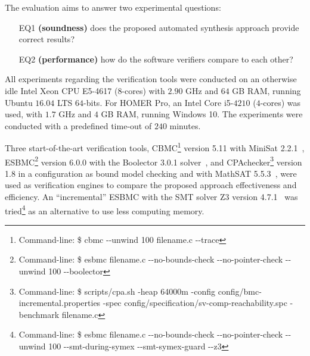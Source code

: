 The evaluation aims to answer two experimental questions: 

\begin{enumerate}

\item[EQ1] \textbf{(soundness)} does the proposed automated synthesis approach provide correct results?

\item[EQ2] \textbf{(performance)} how do the software verifiers compare to each other?

\end{enumerate}

All experiments regarding the verification tools were conducted 
on an otherwise idle Intel Xeon CPU E5-4617 ($8$-cores) with 
$2.90$ GHz and $64$ GB RAM, running Ubuntu $16.04$ LTS $64$-bits. 
For HOMER Pro, an Intel Core i5-$4210$ ($4$-cores) was used, 
with $1.7$ GHz and $4$ GB RAM, running Windows 10. 
The experiments were conducted with a predefined time-out of $240$ minutes.

Three start-of-the-art verification tools, CBMC\footnote{Command-line: \$ cbmc -\phantom{}-unwind 100 filename.c -\phantom{}-trace} version 5.11 with MiniSat 2.2.1~\cite{Kroening}, ESBMC\footnote{Command-line: \$ esbmc filename.c -\phantom{}-no-bounds-check -\phantom{}-no-pointer-check -\phantom{}-unwind 100 -\phantom{}-boolector} version 6.0.0 with the  Boolector 3.0.1 solver~\cite{Brummayer}, %
and CPAchecker\footnote{Command-line: \$ scripts/cpa.sh -heap 64000m -config config/bmc-incremental.properties -spec config/specification/sv-comp-reachability.spc -benchmark filename.c} version 1.8 in a configuration as bound model checking and with MathSAT 5.5.3~\cite{mathsat5}, were used as verification engines to compare the proposed approach effectiveness and efficiency. An ``incremental'' ESBMC with the SMT solver Z3 version 4.7.1~\cite{DeMoura} was tried\footnote{Command-line: \$ esbmc filename.c -\phantom{}-no-bounds-check -\phantom{}-no-pointer-check -\phantom{}-unwind 100 -\phantom{}-smt-during-symex -\phantom{}-smt-symex-guard -\phantom{}-z3} as an alternative to use less computing memory.

